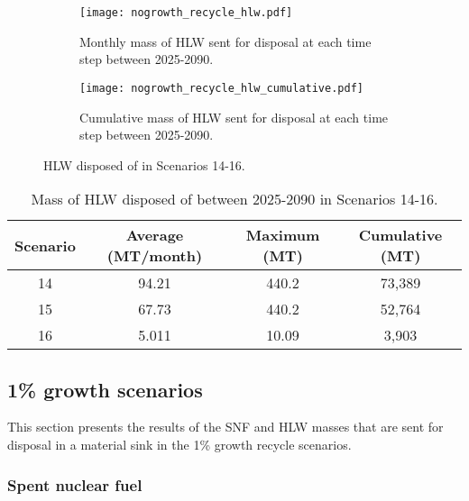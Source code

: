 \begin{figure}[h!]
    \centering
    \begin{subfigure}[b]{0.49\textwidth}
        \centering
        \texttt{[image: nogrowth\_recycle\_hlw.pdf]}
        \caption{Monthly mass of HLW sent for disposal 
        at each time step between 2025-2090.}
        \label{fig:nogrowth_recycle_hlw_all}
    \end{subfigure}
    \hfill
    \begin{subfigure}[b]{0.49\textwidth}
        \centering
        \texttt{[image: nogrowth\_recycle\_hlw\_cumulative.pdf]}
        \caption{Cumulative mass of HLW sent for disposal 
        at each time step between 2025-2090.}
        \label{fig:nogrowth_recycle_hlw_cumulative}
    \end{subfigure}
       \caption{\gls{HLW} disposed of in Scenarios 14-16.}
       \label{fig:nogrowth_recycle_hlw}
\end{figure}

\begin{table}[h!]
    \centering 
    \caption{Mass of HLW disposed of between 2025-2090 in 
    Scenarios 14-16.}
    \label{tab:hlw_14-16}
    \begin{tabular}{c c c c}
        \hline 
        Scenario & Average (MT/month) & Maximum (MT) & Cumulative (MT) \\
        \hline
        14 & 94.21 & 440.2 & 73,389\\
        15 & 67.73 & 440.2 & 52,764\\
        16 & 5.011 & 10.09 & 3,903\\
        \hline
    \end{tabular}
\end{table}


\subsection{1\% growth scenarios}
This section presents the results of the \gls{SNF} and 
\gls{HLW} masses that are sent for disposal in a 
material sink in the 1\% growth recycle scenarios. 
\subsubsection{Spent nuclear fuel}

